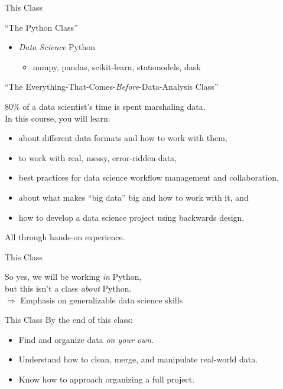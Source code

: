 \documentclass[11pt]{beamer}
\begin{document}
\begin{frame}[c]{This Class}

``The Python Class'' \\

\begin{itemize}
	\pause \item \emph{Data Science} Python
	\begin{itemize}
		\pause \item numpy, pandas, scikit-learn, statsmodels, dask
	\end{itemize}
\end{itemize}
\end{frame}

\begin{frame}[c]{``The Everything-That-Comes-\emph{Before}-Data-Analysis Class''}

\pause \alert{80\%} of a data scientist's time is spent marshaling data. \\

\pause In this course, you will learn:
\begin{itemize}
	\pause \item about different data formats and how to work with them,
	\pause \item to work with real, messy, error-ridden data,
	\pause \item best practices for data science workflow management and collaboration,
	\pause \item about what makes ``big data'' big and how to work with it, and
	\pause \item how to develop a data science project using backwards design.
\end{itemize}
\pause \alert{All} through hands-on experience.
\end{frame}

\begin{frame}[c]{This Class}

	So yes, we will be working \emph{in} Python, \\ 
\pause but this isn't a class \emph{about} Python. \\
\pause $\Rightarrow$ Emphasis on generalizable data science skills

\end{frame}

\begin{frame}[c]{This Class}
By the end of this class:
\begin{itemize}
	\pause \item Find and organize data \emph{on your own}.
	\pause \item Understand how to clean, merge, and manipulate real-world data.
	\pause \item Know how to approach organizing a full project.
\end{itemize}
\end{frame}
\end{document}

